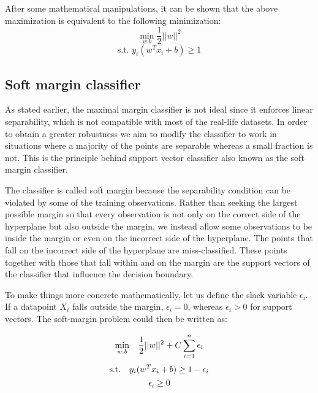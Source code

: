 \documentclass[conference]{IEEEtran}
\begin{document}
After some mathematical manipulations, it can be shown that the above maximization is equivalent to the following minimization:
\begin{equation*}
    \min_{w. b} \frac{1}{2}{||w||^2} 
\end{equation*}
\begin{equation*}
    \textrm{s.t. }y_i(w^Tx_i + b) \geq 1
\end{equation*}

\subsection{Soft margin classifier}

As stated earlier, the maximal margin classifier is not ideal since it enforces linear separability, which is not compatible with most of the real-life datasets. In order to obtain a greater robustness
we aim to modify the classifier to work in situations where a majority of the points are separable whereas a small fraction is not. This is the principle behind support vector classifier also known as the soft margin classifier.

The classifier is called soft margin because the separability condition can be violated by some of the training observations. Rather than seeking the largest possible margin so that every observation is not only on the correct side of the hyperplane but also outside the margin, we instead allow some observations to be inside the margin or even on the incorrect side of the hyperplane. The points that fall on the incorrect side of the hyperplane are miss-classified. These points together with those that fall within and on the margin are the support vectors of the classifier that influence the decision boundary.

To make things more concrete mathematically, let us define the slack variable $\epsilon _i$. If a datapoint $X_i$ falls outside the margin, $\epsilon _i = 0$, whereas $\epsilon _i > 0$ for support vectors. The soft-margin problem could then be written as:

\begin{equation*}
    \min_{w. b} \hspace{0.3cm} \frac{1}{2}{||w||^2} + C\sum_{i=1}^{n}\epsilon _i
\end{equation*}
\begin{equation*}
    \textrm{s.t. } \hspace{0.2cm} y_i(w^Tx_i + b) \geq 1 - \epsilon _i
\end{equation*}
\begin{equation*}
    \epsilon _i \geq 0
\end{equation*}
\end{document}
